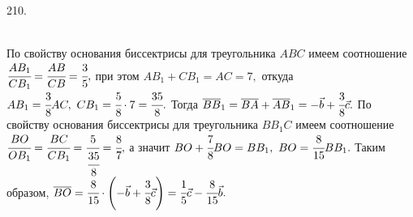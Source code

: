 210. \begin{figure}[ht!]
\end{figure}\\
По свойству основания биссектрисы для треугольника $ABC$ имеем соотношение
$\cfrac{AB_1}{CB_1}=\cfrac{AB}{CB}=\cfrac{3}{5},$ при этом $AB_1+CB_1=AC=7,$ откуда $AB_1=\cfrac{3}{8}AC,\ CB_1=\cfrac{5}{8}\cdot7=\cfrac{35}{8}.$ Тогда $\overline{BB}_1=\overline{BA}+\overline{AB}_1=-\vec{b}+\cfrac{3}{8}\vec{c}.$
По свойству основания биссектрисы для треугольника $BB_1C$ имеем соотношение
$\cfrac{BO}{OB_1}=\cfrac{BC}{CB_1}=\cfrac{5}{\cfrac{35}{8}}=\cfrac{8}{7},$ а значит $BO+\cfrac{7}{8}BO=BB_1,\ BO=\cfrac{8}{15}BB_1.$ Таким образом, $\overline{BO}=\cfrac{8}{15}\cdot\left(-\vec{b}+\cfrac{3}{8}\vec{c}\right)=
\cfrac{1}{5}\vec{c}-\cfrac{8}{15}\vec{b}.$\\
